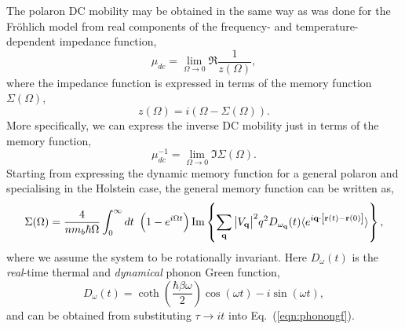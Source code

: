 The polaron DC mobility may be obtained in the same way as was done for the Fr\"ohlich model from real components of the frequency- and temperature-dependent impedance function,
\begin{equation}\label{eqn:mobility}
    \mu_{dc} = \lim_{\Omega \to 0} \Re{\frac{1}{z(\Omega)}},
\end{equation}
where the impedance function is expressed in terms of the memory function $\Sigma(\Omega)$,
\begin{equation}
    z(\Omega) = i \left( \Omega - \Sigma(\Omega) \right).
\end{equation}
More specifically, we can express the inverse DC mobility just in terms of the memory function,
\begin{equation}
    \mu_{dc}^{-1} = \lim_{\Omega \to 0} \Im{\Sigma(\Omega)}.
\end{equation}
Starting from expressing the dynamic memory function for a general polaron and specialising in the Holstein case, the general memory function can be written as,
\begin{equation}
    \Sigma(\Omega) = \frac{4}{n m_b \hbar\Omega} \int_0^{\infty} dt\ \left(1 - e^{i \Omega t}\right) \Im \left\{ \sum_{\vb{q}} \abs{V_{\vb{q}}}^2 q^2 D_{\omega_{\vb{q}}}(t) \langle e^{i \vb{q} \cdot \left[ \vb{r}(t) - \vb{r}(0) \right]} \rangle \right\},
\end{equation}
where we assume the system to be rotationally invariant. Here $D_{\omega}(t)$ is the \emph{real}-time thermal and \emph{dynamical} phonon Green function,
\begin{equation}
    D_\omega(t) = \coth(\frac{\hbar \beta \omega}{2}) \cos(\omega t) - i \sin(\omega t),
\end{equation}
and can be obtained from substituting $\tau \to i t$ into Eq.~(\ref{eqn:phonongf}).

